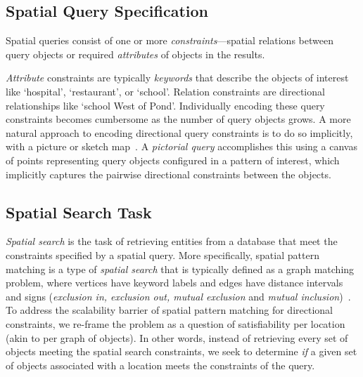\subsection{Spatial Query Specification}
\par{
    Spatial queries consist of one or more \textit{constraints}---spatial relations between query objects or required \textit{attributes} of objects in the results.

    \textit{Attribute} constraints are typically \textit{keywords} that describe the objects of interest like `hospital', `restaurant', or `school'.
    Relation constraints are directional relationships like `school West of Pond'.
    Individually encoding these query constraints becomes cumbersome as the number of query objects grows.
    A more natural approach to encoding directional query constraints is to do so implicitly, with a picture or sketch map~\cite{Osul2023}.
    A \textit{pictorial query} accomplishes this using a canvas of points representing query objects configured in a pattern of interest, which implicitly captures the pairwise directional constraints between the objects. 
    
}


\subsection{Spatial Search Task}
\par{
    \textit{Spatial search} is the task of retrieving entities from a database that meet the constraints specified by a spatial query.
    More specifically, spatial pattern matching is a type of \textit{spatial search} that is typically defined as a graph matching problem, where vertices have keyword labels and edges have distance intervals and signs (\textit{exclusion in, exclusion out, mutual exclusion} and \textit{mutual inclusion})~\cite{Fang2019}.
    To address the scalability barrier of spatial pattern matching for directional constraints, we re-frame the problem as a question of satisfiability per location (akin to per graph of objects).
    In other words, instead of retrieving every set of objects meeting the spatial search constraints, we seek to determine \emph{if} a given set of objects associated with a location meets the constraints of the query.
}








